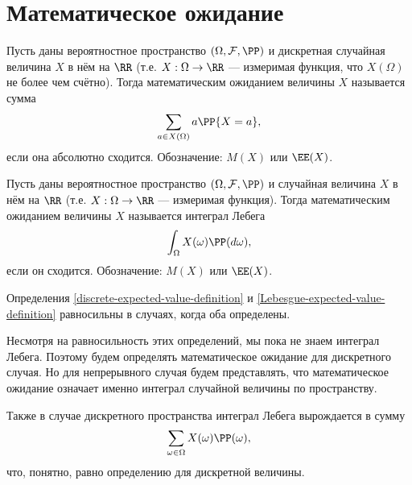 \documentclass[12pt,a4paper]{article}
\begin{document}
    \section{Математическое ожидание}

    \begin{definition}\label{discrete-expected-value-definition}
        Пусть даны вероятностное пространство $(\Omega, \mathcal{F}, \PP)$ и дискретная случайная величина $X$ в нём на $\RR$ (т.е. $X: \Omega \to \RR$ --- измеримая функция, что $X(\Omega)$ не более чем счётно). Тогда математическим ожиданием величины $X$ называется сумма
        \[\sum_{a \in X(\Omega)} a \PP\{X = a\},\]
        если она абсолютно сходится. Обозначение: $M(X)$ или $\EE(X)$.
    \end{definition}

    \begin{definition}\label{Lebesgue-expected-value-definition}
        Пусть даны вероятностное пространство $(\Omega, \mathcal{F}, \PP)$ и случайная величина $X$ в нём на $\RR$ (т.е. $X: \Omega \to \RR$ --- измеримая функция). Тогда математическим ожиданием величины $X$ называется интеграл Лебега
        \[\int_\Omega X(\omega) \PP(d \omega),\]
        если он сходится. Обозначение: $M(X)$ или $\EE(X)$.
    \end{definition}

    \begin{statement}
        Определения \ref{discrete-expected-value-definition} и \ref{Lebesgue-expected-value-definition} равносильны в случаях, когда оба определены.
    \end{statement}

    \begin{remark}
        Несмотря на равносильность этих определений, мы пока не знаем интеграл Лебега. Поэтому будем определять математическое ожидание для дискретного случая. Но для непрерывного случая будем представлять, что математическое ожидание означает именно интеграл случайной величины по пространству.

        Также в случае дискретного пространства интеграл Лебега вырождается в сумму
        \[\sum_{\omega \in \Omega} X(\omega) \PP(\omega),\]
        что, понятно, равно определению для дискретной величины.
    \end{remark}
\end{document}
